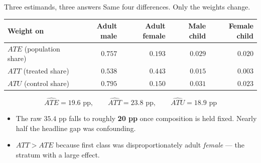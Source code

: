 \documentclass[
  11pt,
  ignorenonframetext,
  aspectratio=169,
]{beamer}
\providecommand{\tightlist}{%
  \setlength{\itemsep}{0pt}\setlength{\parskip}{0pt}}
\begin{document}
\begin{frame}{Three estimands, three answers}
\protect{}\label{three-estimands-three-answers}
Same four differences. Only the weights change.

\begin{center}
\begin{tabular}{lrrrr}
\toprule
Weight on & Adult male & Adult female & Male child & Female child \\
\midrule
$ATE$ (population share)  & $0.757$ & $0.193$ & $0.029$ & $0.020$ \\
$ATT$ (treated share)     & $0.538$ & $0.443$ & $0.015$ & $0.003$ \\
$ATU$ (control share)     & $0.795$ & $0.150$ & $0.031$ & $0.023$ \\
\bottomrule
\end{tabular}
\end{center}

\vspace{0.3em}

\[
\widehat{ATE} = 19.6 \text{ pp}, \qquad
\widehat{ATT} = 23.8 \text{ pp}, \qquad
\widehat{ATU} = 18.9 \text{ pp}
\]

\begin{itemize}
\tightlist
\item
  The raw \(35.4\) pp falls to roughly \textbf{20 pp} once composition
  is held fixed. Nearly half the headline gap was confounding.
\item
  \(ATT > ATE\) because first class was disproportionately adult
  \emph{female} --- the stratum with a large effect.
\end{itemize}
\end{frame}
\end{document}

